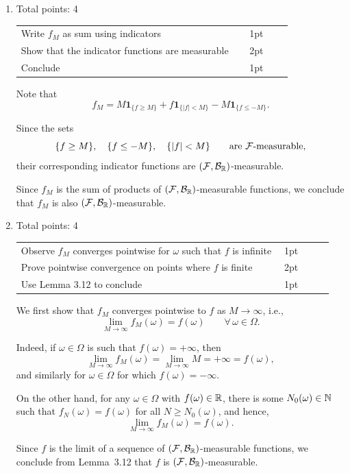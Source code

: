\documentclass{lecturenotes}
\newcommand{\rubric}[1]{#1}
\begin{document}
\begin{enumerate}[label=(\alph*)]
	\item \rubric{ Total points: 4 \hfill
	
	\begin{tabular}{p{0.8\linewidth}p{0.15\linewidth}}
	\hline
	Write $f_M$ as sum using indicators & 1pt\\
	Show that the indicator functions are measurable & 2pt\\
	Conclude & 1pt\\
	\hline
	\end{tabular}
	
	}
	
	Note that
	\[
		f_M = M\mathbf{1}_{\{f\ge M\}} + f\mathbf{1}_{\{|f|< M\}} - M\mathbf{1}_{\{f\le -M\}}.
	\]
	
	Since the sets
	\[
		\{f\ge M\},\quad \{f\le -M\},\quad \{|f|<M\}\qquad\text{are $\mathcal F$-measurable},
	\]
	their corresponding indicator functions are $(\mathcal F,\mathcal B_{\mathbb R})$-measurable. 
	
	Since $f_M$ is the sum of products of $(\mathcal F,\mathcal B_{\mathbb R})$-measurable functions, we conclude that $f_M$ is also $(\mathcal F,\mathcal B_{\mathbb R})$-measurable.
	
	\item \rubric{ Total points: 4 \hfill
	
	\begin{tabular}{p{0.8\linewidth}p{0.15\linewidth}}
	\hline
	Observe $f_M$ converges pointwise for $\omega$ such that $f$ is infinite & 1pt\\
	Prove pointwise convergence on points where $f$ is finite & 2pt\\
	Use Lemma 3.12 to conclude & 1pt\\
	\hline
	\end{tabular}
	
	}
	We first show that $f_M$ converges pointwise to $f$ as $M\to\infty$, i.e.,
	\[
		\lim_{M\to\infty} f_M(\omega) = f(\omega)\qquad\forall\, \omega\in\Omega.
	\]
	
	Indeed, if $\omega \in \Omega$ is such that $f(\omega)=+\infty$, then
	\[
		\lim_{M\to\infty} f_M(\omega) = \lim_{M\to\infty} M = +\infty = f(\omega),
	\]
	and similarly for $\omega\in\Omega$ for which $f(\omega)=-\infty$. 
	
	On the other hand, for any $\omega\in\Omega$ with $f(\omega)\in\mathbb R$, there is some $N_0(\omega)\in\mathbb N$ such that $f_N(\omega)=f(\omega)$ for all $N\ge N_0(\omega)$, and hence,
	\[
		\lim_{M\to\infty} f_M(\omega) = f(\omega).
	\]
	
	Since $f$ is the limit of a sequence of $(\mathcal F,\mathcal B_{\mathbb R})$-measurable functions, we conclude from Lemma~3.12 that $f$ is $(\mathcal F,\mathcal B_{\mathbb R})$-measurable.
\end{enumerate}
\end{document}
